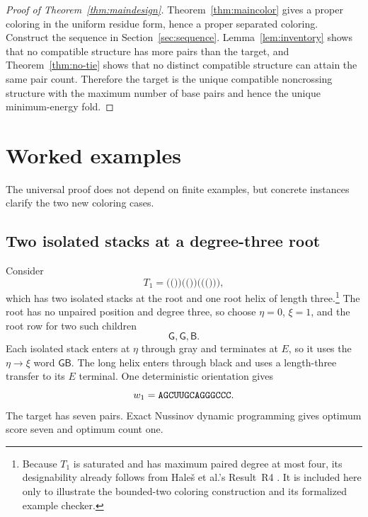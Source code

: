 \documentclass[11pt]{article}
\newcommand{\Bcol}{\mathsf{B}}
\newcommand{\Gray}{\mathsf{G}}
\begin{document}
\begin{proof}[Proof of Theorem~\ref{thm:maindesign}]
Theorem~\ref{thm:maincolor} gives a proper coloring in the uniform residue form, hence a proper separated coloring.  Construct the sequence in Section~\ref{sec:sequence}.  Lemma~\ref{lem:inventory} shows that no compatible structure has more pairs than the target, and Theorem~\ref{thm:no-tie} shows that no distinct compatible structure can attain the same pair count.  Therefore the target is the unique compatible noncrossing structure with the maximum number of base pairs and hence the unique minimum-energy fold.
\end{proof}

\section{Worked examples}
\label{sec:examples}

The universal proof does not depend on finite examples, but concrete instances clarify the two new coloring cases.

\subsection{Two isolated stacks at a degree-three root}

Consider
\[
T_1=\texttt{(())(())((()))},
\]
which has two isolated stacks at the root and one root helix of length three.\footnote{Because $T_1$ is saturated and has maximum paired degree at most four, its designability already follows from Hale\v{s} et al.'s Result~R4 \citep{hales2017}.  It is included here only to illustrate the bounded-two coloring construction and its formalized example checker.}  The root has no unpaired position and degree three, so choose $\eta=0$, $\xi=1$, and the root row for two such children
\[
\Gray,\Gray,\Bcol.
\]
Each isolated stack enters at $\eta$ through gray and terminates at $E$, so it uses the $\eta\to\xi$ word $\Gray\Bcol$.  The long helix enters through black and uses a length-three transfer to its $E$ terminal.  One deterministic orientation gives
\[
w_1=\texttt{AGCUUGCAGGGCCC}.
\]
The target has seven pairs.  Exact Nussinov dynamic programming \citep{nussinov1980} gives optimum score seven and optimum count one.
\end{document}
